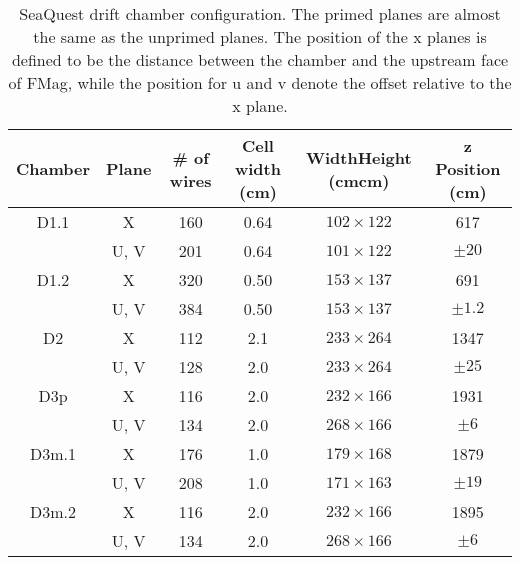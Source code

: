 \documentclass[../main.tex]{subfiles}
\begin{document}
\begin{table}[h!]
	\centering
	\caption{SeaQuest drift chamber configuration. The primed planes are almost the same as the unprimed
		planes. The position of the x planes is defined to be the distance between the chamber and the
		upstream face of FMag, while the position for u and v denote the offset relative to the x plane.}
	\label{table:chamber}
	\begin{tabular}{cccccc}
		\hline
		Chamber & Plane & \# of wires & Cell width (\unit{\cm}) & Width\texttimes Height (\unit{\cm}\texttimes\unit{\cm}) & z Position (\unit{cm}) \\ \hline
		D1.1    & X     & \num{160}   & \num{0.64}              & $102\times 122$                                         & \num{617}              \\
		        & U, V  & \num{201}   & \num{0.64}              & $101\times 122$                                         & $\pm20$                \\
		D1.2    & X     & \num{320}   & \num{0.50}              & $153\times 137$                                         & \num{691}              \\
		        & U, V  & \num{384}   & \num{0.50}              & $153\times 137$                                         & $\pm1.2$               \\
		D2      & X     & \num{112}   & \num{2.1}               & $233\times264$                                          & \num{1347}             \\
		        & U, V  & \num{128}   & \num{2.0}               & $233\times264$                                          & $\pm25$                \\
		D3p     & X     & \num{116}   & \num{2.0}               & $232\times166$                                          & \num{1931}             \\
		        & U, V  & \num{134}   & \num{2.0}               & $268\times166$                                          & $\pm6$                 \\
		D3m.1   & X     & \num{176}   & \num{1.0}               & $179\times168$                                          & \num{1879}             \\
		        & U, V  & \num{208}   & \num{1.0}               & $171\times163$                                          & $\pm19$                \\
		D3m.2   & X     & \num{116}   & \num{2.0}               & $232\times166$                                          & \num{1895}             \\
		        & U, V  & \num{134}   & \num{2.0}               & $268\times166$                                          & $\pm6$
	\end{tabular}
\end{table}
\end{document}
